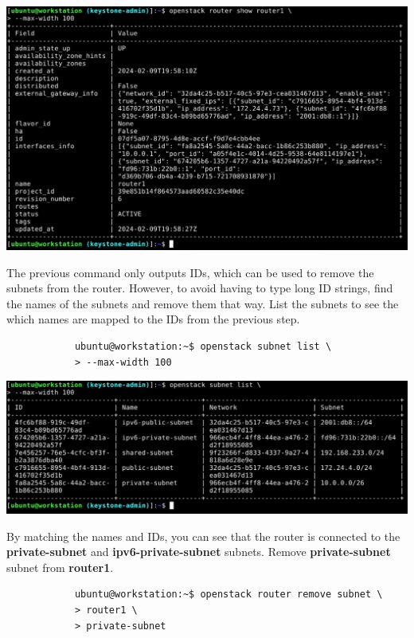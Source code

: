 \documentclass[letterpaper, 12pt]{article}
\begin{document}
\begin{enumerate}
\begin{labstep}
        \begin{center}
            \includegraphics[width=\linewidth]{images/part1/step5.png}
        \end{center}
    \end{labstep}

    \begin{labstep}
        The previous command only outputs IDs, which can be used to remove the subnets from the router.
        However, to avoid having to type long ID strings, find the names of the subnets and remove them that way.
        List the subnets to see the which names are mapped to the IDs from the previous step.
        \begin{lstlisting}
            ubuntu@workstation:~$ openstack subnet list \
            > --max-width 100
        \end{lstlisting}

        \begin{center}
            \includegraphics[width=\linewidth]{images/part1/step6.png}
        \end{center}
    \end{labstep}

    \begin{labstep}
        By matching the names and IDs, you can see that the router is connected to the \textbf{private-subnet} and \textbf{ipv6-private-subnet} subnets.
        Remove \textbf{private-subnet} subnet from \textbf{router1}.
        \begin{lstlisting}
            ubuntu@workstation:~$ openstack router remove subnet \
            > router1 \
            > private-subnet
        \end{lstlisting}


\end{labstep}
\end{enumerate}
\end{document}
